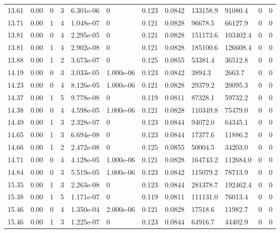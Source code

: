 \documentclass[preview]{standalone}
\begin{document}
{{{{\begin{tabular}{L{1.2cm}C{1.2cm} C{0.3cm}C{0.5cm} C{1.4cm}C{1.4cm} C{1.4cm}C{1.4cm} C{1.6cm}C{1.6cm} C{1.6cm}C{1.6cm}}
  13.61  &  0.00  & 0     &  3 &  6.301e-06  & 0  &  0.123&   0.0842& 133158.9 & 91080.4   &  0 & 0  \\ 
  13.71  &  0.00  & 1     &  4 &  1.048e-07  & 0  &  0.121&   0.0828& 96678.5 & 66127.9   &  0 & 0  \\ 
  13.81  &  0.00  & 0     &  4 &  2.295e-05  & 0  &  0.121&   0.0828& 151173.6 & 103402.4   &  0 & 0  \\ 
  13.81  &  0.00  & 1     &  4 &  2.902e-08  & 0  &  0.121&   0.0828& 185100.6 & 126608.4   &  0 & 0  \\ 
  13.88  &  0.00  & 1     &  2 &  3.673e-07  & 0  &  0.125&   0.0855& 53381.4 & 36512.8   &  0 & 0  \\ 
  14.19  &  0.00  & 0     &  3 &  3.033e-05  & 1.000e-06  &  0.123&   0.0842& 3894.3 & 2663.7   &  0 & 0  \\ 
  14.23  &  0.00  & 0     &  4 &  8.126e-05  & 1.000e-06  &  0.121&   0.0828& 29379.2 & 20095.3   &  0 & 0  \\ 
  14.37  &  0.00  & 1     &  5 &  9.778e-08  & 0  &  0.119&   0.0811& 87328.1 & 59732.2   &  0 & 0  \\ 
  14.38  &  0.00  & 0     &  4 &  4.598e-05  & 1.000e-06  &  0.121&   0.0828& 110349.8 & 75479.0   &  0 & 0  \\ 
  14.49  &  0.00  & 1     &  3 &  2.328e-07  & 0  &  0.123&   0.0844& 94072.0 & 64345.1   &  0 & 0  \\ 
  14.65  &  0.00  & 1     &  3 &  6.694e-08  & 0  &  0.123&   0.0844& 17377.6 & 11886.2   &  0 & 0  \\ 
  14.66  &  0.00  & 1     &  2 &  2.472e-08  & 0  &  0.125&   0.0855& 50004.5 & 34203.0   &  0 & 0  \\ 
  14.71  &  0.00  & 0     &  4 &  4.128e-05  & 1.000e-06  &  0.121&   0.0828& 164743.2 & 112684.0   &  0 & 0  \\ 
  14.84  &  0.00  & 0     &  3 &  5.519e-05  & 1.000e-06  &  0.123&   0.0842& 115079.2 & 78713.9   &  0 & 0  \\ 
  15.35  &  0.00  & 1     &  3 &  2.263e-08  & 0  &  0.123&   0.0844& 281378.7 & 192462.4   &  0 & 0  \\ 
  15.38  &  0.00  & 1     &  5 &  1.171e-07  & 0  &  0.119&   0.0811& 111131.0 & 76013.4   &  0 & 0  \\ 
  15.46  &  0.00  & 0     &  4 &  1.350e-04  & 2.000e-06  &  0.121&   0.0828& 17518.6 & 11982.7   &  0 & 0  \\ 
  15.46  &  0.00  & 1     &  3 &  1.225e-07  & 0  &  0.123&   0.0844& 64916.7 & 44402.9   &  0 & 0  \\ 

\end{tabular}}}}}
\end{document}
